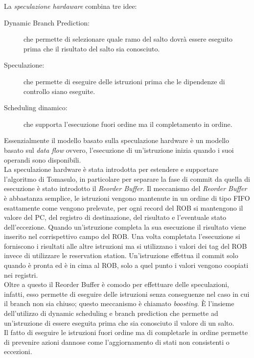 La \emph{speculazione hardaware} combina tre idee:
\begin{description}
\item[Dynamic Branch Prediction:] che permette di selezionare quale ramo del salto dovrà essere eseguito prima che il risultato del salto sia conosciuto.
\item[Speculazione:] che permette di eseguire delle istruzioni prima che le dipendenze di controllo siano eseguite.
\item[Scheduling dinamico:] che supporta l'esecuzione fuori ordine ma il completamento in ordine.
\end{description}
Essenzialmente il modello basato sulla speculazione hardware è un modello basato sul \emph{data flow} ovvero, l'esecuzione di un'istruzione inizia quando i suoi operandi sono disponibili.\\
La speculazione hardware è stata introdotta per estendere e supportare l'algoritmo di Tomasulo, in particolare per separare la fase di commit da quella di esecuzione è stato introdotto il \emph{Reorder Buffer}. 
Il meccanismo del \emph{Reorder Buffer} è abbastanza semplice, le istruzioni vengono mantenute in un ordine di tipo FIFO esattamente come vengono prelevate, per ogni record del ROB si mantengono il valore del PC, del registro di destinazione, del risultato e l'eventuale stato dell'eccezione. Quando un'istruzione completa la sua esecuzione il risultato viene inserito nel corrispettivo campo del ROB. Una volta completata l'esecuzione si forniscono i risultati alle altre istruzioni ma si utilizzano i valori dei tag del ROB invece di utilizzare le reservation station. Un'istruzione effettua il commit solo quando è pronta ed è in cima al ROB, solo a quel punto i valori vengono coopiati nei registri.\\
Oltre a questo il Reorder Buffer è comodo per effettuare delle speculazioni, infatti, esso permette di eseguire delle istruzioni senza conseguenze nel caso in cui il branch non sia chiuso; questo meccanismo è chiamato \emph{boosting}. \uppercase{è} l'insieme dell'utilizzo di dynamic scheduling e branch prediction che permette ad un'istruzione di essere eseguita prima che sia conosciuto il valore di un salto.\\
Il fatto di eseguire le istruzioni fuori ordine ma di completarle in ordine permette di prevenire azioni dannose come l'aggiornamento di stati non consistenti o eccezioni.
